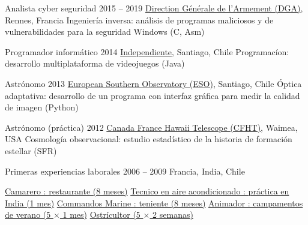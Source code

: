 \begin{joblist}[12.8][8.4][4]

\setlength{\parskip}{0.3cm}
\vspace{-0.4cm}

\item[Analista cyber seguridad]{2015 -- 2019}
    {
  \href{http://www.defense.gouv.fr/dga/}{Direction Générale de l'Armement (DGA)}, Rennes, Francia
    }
    {Ingeniería inversa: análisis de programas maliciosos y de vulnerabilidades para la seguridad Windows (C, Asm)}


\item[Programador informático]{2014}
    {
    \href{https://tinmarino.github.io/Page/}{Independiente}, Santiago, Chile
    }
    {Programacíon: desarrollo multiplataforma de videojuegos (Java)}



\item[Astrónomo]{2013}
    {
    \href{http://www.eso.org/public/}{European Southern Observatory (ESO)}, Santiago, Chile
    }
    {Óptica adaptativa: desarrollo de un programa con interfaz gráfica para medir la calidad de imagen (Python)}

\item[Astrónomo (práctica)]{2012}
    {
\href{https://www.cfht.hawaii.edu/}{Canada France Hawaii Telescope (CFHT)}, Waimea, USA
    }
    {Cosmología observacional: estudio estadístico de la historia de formación estellar (SFR)}
    
\item[Primeras experiencias laborales]{2006 -- 2009}
    {
    Francia, India, Chile
    }
    {
    \renewcommand\labelitemi{{}}
    \vspace{-0.8cm}
    \setlength{\parskip}{0cm}

    \begin{itemize}
    \setlength\itemsep{0cm}

    \cvitem \href{http://www.insertcoin.cl/}{ Camarero : restaurante (8 meses)}
    \cvitem \href{http://www.dupont.co.in/}{ Tecnico en aire acondicionado : práctica en India (1 mes)}
    \cvitem \href{http://www.defense.gouv.fr/marine/organisation/forces/fusiliers-marins-et-commandos/force-maritime-des-fusiliers-marins-et-commandos}{ Commandos Marine : teniente (8 meses)}
    \cvitem \href{http://www.vacances-pour-tous.org/}{ Animador : campamentos de verano (5 $\times$ 1 mes)}
    \cvitem \href{http://huitresdesaintvaast.fr/}{ Ostrícultor (5 $\times$ 2 semanas)}
    \end{itemize}
  }

    
\end{joblist}


